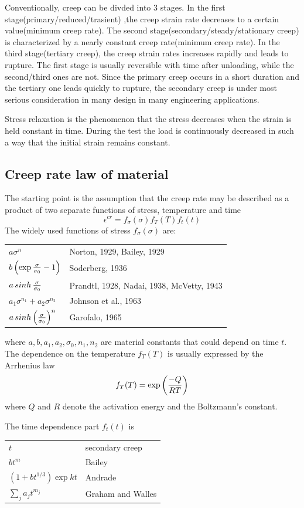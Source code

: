 \documentclass[10pt]{article}
\begin{document}
Conventionally, creep can be divded into $3$ stages. In the first stage(primary/reduced/trasient) ,the creep strain rate decreases to a certain value(minimum creep rate). The second stage(secondary/steady/stationary creep) is characterized by a nearly constant creep rate(minimum creep rate). In the third stage(tertiary creep), the creep strain rates increases rapidly and leads to rupture. The first stage is usually reversible with time after unloading, while the second/third ones are not. Since the primary creep occurs in a short duration and the tertiary one leads quickly to rupture, the secondary creep is under most serious consideration in many design in many engineering applications.

Stress relaxation is the phenomenon that the stress decreases when the strain is held constant in time. During the test the load is continuously decreased in such a way that the initial strain remains constant.

\subsection{Creep rate law of material}
\label{sec:Creep}
The starting point is the assumption that the creep rate may be described as a product of two separate functions of stress, temperature and time
\[
\epsilon^{cr}=f_\sigma (\sigma) f_T(T) f_t(t)
\]
The widely used functions of stress $f_\sigma(\sigma)$ are:

\begin{tabular}{ll}
$a\sigma^n$ & Norton, 1929, Bailey, 1929 \\
$b\left( \exp{\sigma\over \sigma_0} -1 \right)$ & Soderberg, 1936 \\
$a\mathop{sinh}{\sigma\over \sigma_0}$ & Prandtl, 1928, Nadai, 1938, McVetty, 1943\\
$a_1\sigma^{n_1} + a_2 \sigma^{n_2}$ & Johnson et al., 1963 \\
$a\mathop{sinh} \left( {\sigma\over \sigma_0}\right)^n$ & Garofalo, 1965
\end{tabular}

where $a,b,a_1,a_2,\sigma_0,n_1,n_2$ are material constants that could depend on time $t$. The dependence on the temperature $f_T(T)$ is usually expressed by the Arrhenius law
\[
f_T(T) = \exp \left( {-Q\over RT}\right)
\]
where $Q$ and $R$ denote the activation energy and the Boltzmann's constant.

The time dependence part $f_t(t)$ is

\begin{tabular}{ll}
$t$ & secondary creep \\
$bt^m$ & Bailey \\
$(1+bt^{1/3})\exp{kt}$ & Andrade\\
$\sum_j a_j t^{m_j}$ & Graham and Walles
\end{tabular}
\end{document}
